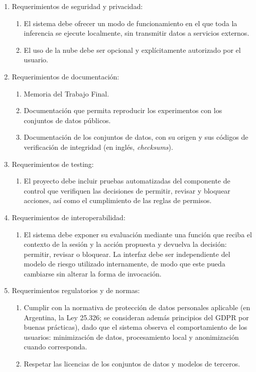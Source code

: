 \documentclass[
11pt, %
]{charter}
\begin{document}
\begin{enumerate}
\begin{enumerate}
			\item El sistema debe ocupar como máximo 1~GB en disco.
		\end{enumerate}
	\item Requerimientos de seguridad y privacidad:
		\begin{enumerate}
			\item El sistema debe ofrecer un modo de funcionamiento en el que toda la inferencia se ejecute localmente, sin transmitir datos a servicios externos.
			\item El uso de la nube debe ser opcional y explícitamente autorizado por el usuario.
		\end{enumerate}
	\item Requerimientos de documentación:
		\begin{enumerate}
			\item Memoria del Trabajo Final.
			\item Documentación que permita reproducir los experimentos con los conjuntos de datos públicos.
			\item Documentación de los conjuntos de datos, con su origen y sus códigos de verificación de integridad (en inglés, \textit{checksums}).
		\end{enumerate}
	\item Requerimientos de testing:
		\begin{enumerate}
			\item El proyecto debe incluir pruebas automatizadas del componente de control que verifiquen las decisiones de permitir, revisar y bloquear acciones, así como el cumplimiento de las reglas de permisos.
		\end{enumerate}
	\item Requerimientos de interoperabilidad:
		\begin{enumerate}
			\item El sistema debe exponer su evaluación mediante una función que reciba el contexto de la sesión y la acción propuesta y devuelva la decisión: permitir, revisar o bloquear. La interfaz debe ser independiente del modelo de riesgo utilizado internamente, de modo que este pueda cambiarse sin alterar la forma de invocación.
		\end{enumerate}
	\item Requerimientos regulatorios y de normas:
		\begin{enumerate}
			\item Cumplir con la normativa de protección de datos personales aplicable (en Argentina, la Ley 25.326; se consideran además principios del GDPR por buenas prácticas), dado que el sistema observa el comportamiento de los usuarios: minimización de datos, procesamiento local y anonimización cuando corresponda.
			\item Respetar las licencias de los conjuntos de datos y modelos de terceros.
		\end{enumerate}
\end{enumerate}
\end{document}

